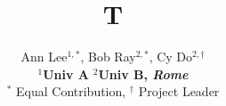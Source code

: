 \documentclass{article}
\begin{document}
\title{T}
\author{Ann Lee$^{1,*}$, Bob Ray$^{2,*}$, Cy Do$^{2,\dagger}$\\
\textbf{$^1$Univ A}  \textbf{$^2$Univ B, \emph{Rome}}\\
$^*$ Equal Contribution, $^\dagger$ Project Leader}
\maketitle
\end{document}
